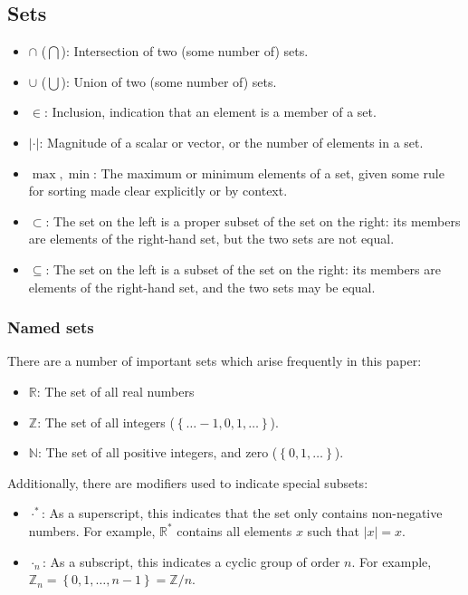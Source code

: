 \documentclass{article}
\newcommand{\braces}[1]{\ensuremath{\left\lbrace #1 \right\rbrace}}
\newcommand{\integers}{\ensuremath{\mathbb{Z}}}
\newcommand{\wholes}{\ensuremath{\mathbb{N}}}
\newcommand{\reals}{\ensuremath{\mathbb{R}}}
\newcommand{\abs}[1]{\ensuremath{\left|#1\right|}}
\begin{document}
\begin{appendix}
\subsection{Sets}
\begin{itemize}
\item $\cap$ ($\bigcap$): Intersection of two (some number of) sets.
\item $\cup$ ($\bigcup$): Union of two (some number of) sets.
\item $\in$: Inclusion, indication that an element is a member of a set.
\item $\abs{\cdot}$: Magnitude of a scalar or vector, or the number of elements in a set.
\item $\max,\min$: The maximum or minimum elements of a set, given some rule for sorting made clear explicitly or by context.
\item $\subset$: The set on the left is a proper subset of the set on the right: its members are elements of the right-hand set, but the two sets are not equal.
\item $\subseteq$: The set on the left is a subset of the set on the right: its members are elements of the right-hand set, and the two sets may be equal.
\end{itemize}

\subsubsection{Named sets}
There are a number of important sets which arise frequently in this paper:
\begin{itemize}
\item \reals: The set of all real numbers
\item \integers: The set of all integers (\braces{\ldots-1,0,1,\ldots}).
\item \wholes: The set of all positive integers, and zero (\braces{0,1,\ldots}).
\end{itemize}
Additionally, there are modifiers used to indicate special subsets:
\begin{itemize}
\item $\cdot^{*}$: As a superscript, this indicates that the set only contains non-negative numbers. For example, $\reals^{*}$ contains all elements $x$ such that $\abs{x}=x$.
\item $\cdot_{n}$: As a subscript, this indicates a cyclic group of order $n$. For example, $\integers_{n}=\braces{0,1,\ldots,n-1}=\integers/n$. 
\end{itemize}


\end{appendix}
\end{document}
